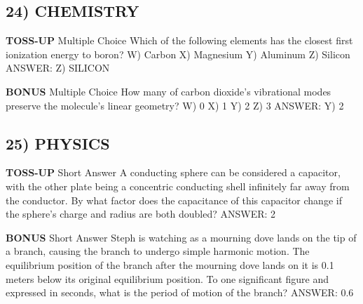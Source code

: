 \documentclass{article}
\begin{document}
\subsection*{24) CHEMISTRY}
\textbf{TOSS-UP}
Multiple Choice Which of the following elements has the closest first ionization energy to boron?
W) Carbon
X) Magnesium
Y) Aluminum
Z) Silicon
ANSWER: Z) SILICON

\textbf{BONUS}
Multiple Choice How many of carbon dioxide's vibrational modes preserve the molecule's linear geometry?
W) 0
X) 1
Y) 2
Z) 3
ANSWER: Y) 2

\subsection*{25) PHYSICS}
\textbf{TOSS-UP}
Short Answer A conducting sphere can be considered a capacitor, with the other plate being a concentric conducting shell infinitely far away from the conductor. By what factor does the capacitance of this capacitor change if the sphere's charge and radius are both doubled?
ANSWER: 2

\textbf{BONUS}
Short Answer Steph is watching as a mourning dove lands on the tip of a branch, causing the branch to undergo simple harmonic motion. The equilibrium position of the branch after the mourning dove lands on it is 0.1 meters below its original equilibrium position. To one significant figure and expressed in seconds, what is the period of motion of the branch?
ANSWER: 0.6
\end{document}
